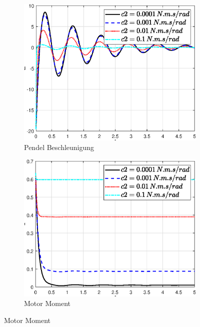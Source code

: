 \begin{figure}
\begin{subfigure}[b]{0.49 \linewidth}
    \end{subfigure}
    \begin{subfigure}[b]{0.49 \linewidth}
        \includegraphics[width=\linewidth]{Bilder/5_sensi/fig/c2/theta_punkt_punkt.eps}
        \caption{Pendel Beschleunigung}
        \label{fig:c2_theta_punkt_punkt}
    \end{subfigure}
    \begin{subfigure}[b]{0.49\linewidth}
        \includegraphics[width=\linewidth]{Bilder/5_sensi/fig/c2/tau.eps}
        \caption{Motor Moment}
        \label{fig:c2_tau}
    \end{subfigure}

\end{figure}
